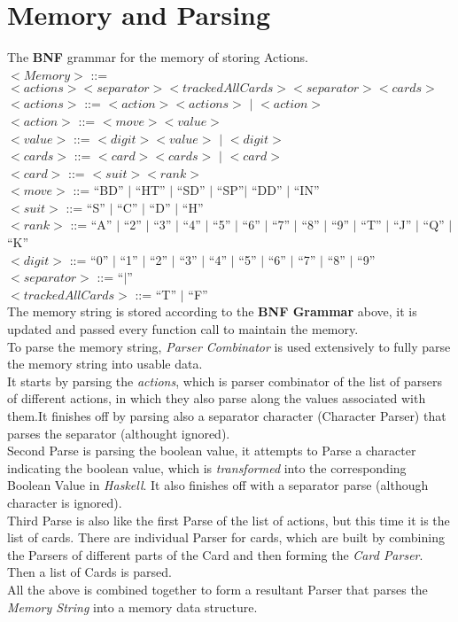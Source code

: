 \documentclass{article}
\begin{document}
\newpage
	\section{Memory and Parsing}
	The \textbf{BNF} grammar for the memory of storing Actions.\\
		$<Memory>$ ::= $<actions><separator><trackedAllCards><separator><cards>$\\
		$<actions>$ ::= $<action><actions>$ $|$ $<action>$\\
		$<action>$ ::= $<move><value>$\\
		$<value>$ ::= $<digit><value>$ $|$ $<digit>$\\
		$<cards>$ ::= $<card><cards>$ $|$ $<card>$\\
		$<card>$ ::= $<suit><rank>$\\	
		$<move>$ ::= ``BD'' $|$ ``HT'' $|$ ``SD'' $|$ ``SP''$|$ ``DD'' $|$ ``IN''\\
		$<suit>$ ::= ``S'' $|$ ``C'' $|$ ``D'' $|$ ``H''\\
		$<rank>$ ::= ``A'' $|$ ``2'' $|$ ``3'' $|$ ``4'' $|$ ``5'' $|$ ``6'' $|$ ``7'' $|$ ``8'' $|$ ``9'' $|$ ``T'' $|$ ``J'' $|$ ``Q'' $|$ ``K''\\
		$<digit>$ ::= ``0'' $|$ ``1'' $|$ ``2'' $|$ ``3'' $|$ ``4'' $|$ ``5'' $|$ ``6'' $|$ ``7'' $|$ ``8'' $|$ ``9''\\
		$<separator>$ ::= ``$|$''\\
		$<trackedAllCards>$ ::= ``T'' $|$ ``F''\\
	The memory string is stored according to the \textbf{BNF Grammar} above, it is updated and passed every function call to maintain the memory.\\
	To parse the memory string, \emph{Parser Combinator} is used extensively to fully parse the memory string into usable data.\\
	It starts by parsing the \emph{actions}, which is parser combinator of the list of parsers of different actions, in which they also parse along the values associated with them.It finishes off by parsing also a separator character (Character Parser) that parses the separator (althought ignored).\\
	Second Parse is parsing the boolean value, it attempts to Parse a character indicating the boolean value, which is \emph{transformed} into the corresponding Boolean Value in \emph{Haskell}. It also finishes off with a separator parse (although character is ignored).\\
	Third Parse is also like the first Parse of the list of actions, but this time it is the list of cards. There are individual Parser for cards, which are built by combining the Parsers of different parts of the Card and then forming the \emph{Card Parser}. Then a list of Cards is parsed.\\ 
	All the above is combined together to form a resultant Parser that parses the \emph{Memory String} into a memory data structure.
\end{document}
